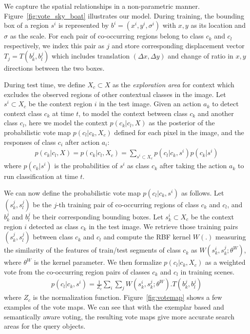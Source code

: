 We capture the spatial relationships in a non-parametric manner. Figure~\ref{fig:vote_sky_boat} illustrates our model. During training, the bounding box of a region $s^i$ is represented by $b^i = (x^i, y^i, \sigma^i)$ with $x, y$ as its location and $\sigma$ as the scale. For each pair of co-occurring regions belong to class $c_k$ and $c_l$ respectively, we index this pair as $j$ and store corresponding displacement vector $T_j= T(b^j_k, b^j_l)$ which includes translation $(\Delta x,\Delta y)$ and change of ratio in $x, y$ directions between the two boxes. 

During test time,  we define $X_c \subset X$ as the \textit{exploration area} for context which excludes the observed regions of other contextual classes in the image. Let $s^i \subset X_c$ be the context region $i$ in the test image. Given an action $a_k$ to detect context class $c_k$ at time $t$, to model the context between class $c_k$ and another class $c_l$, here we model the context $p(c_k|c_l,X)$ as the posterior of the probabilistic vote map $p(c_l|c_k,X_c)$ defined for each pixel in the image, and the responses of class $c_i$ after action $a_i$:
\begin{eqnarray}
p(c_k|c_l,X)  = p(c_k|c_l,X_c) = \sum_{s^i \subset X_c} p(c_l|c_k,s^i)p(c_k|s^i)
\end{eqnarray}
where $p(c_k|s^i)$ is the probabilities of $s^i$ as class $c_k$ after taking the action $a_k$ to run classification at time $t$.

 We can now define the probabilistic vote map $p(c_l|c_k,s^i)$ as follows.  Let $(s_k^j, s_l^j)$ be the $j$-th training pair of co-occurring regions of class $c_k$ and $c_l$, and $b_{k}^j$ and $b_l^j$ be their corresponding bounding boxes. Let $s_k^i \subset X_c$ be the context region $i$ detected as class $c_k$ in the test image. We retrieve those training pairs $(s_k^j, s_l^j)$ between class $c_k$ and $c_l$ and compute the RBF kernel $W(.)$ measuring the similarity of the features of train/test segments of class $c_k$ as $W(s_k^i,s_k^j;\theta^W)$, where $\theta^W$ is the kernel parameter. We then formalize $p(c_l|c_k,X_c)$ as a weighted vote from the co-occurring region pairs of classes $c_k$ and $c_l$ in training scenes.
\begin{eqnarray}
\label{eq:votemap}
p(c_l|c_k,s^i) = \frac{1}{Z_c}\sum_{i} \sum_{j} W(s_k^i,s_k^j;\theta^W).T(b_k^j,b_l^j)
\end{eqnarray}
where $Z_c$ is the normalization function. Figure~\ref{fig:votemap} shows a few examples of the vote maps. We can see that with the exemplar based and semantically aware voting, the resulting vote maps give more accurate search areas for the query objects.

